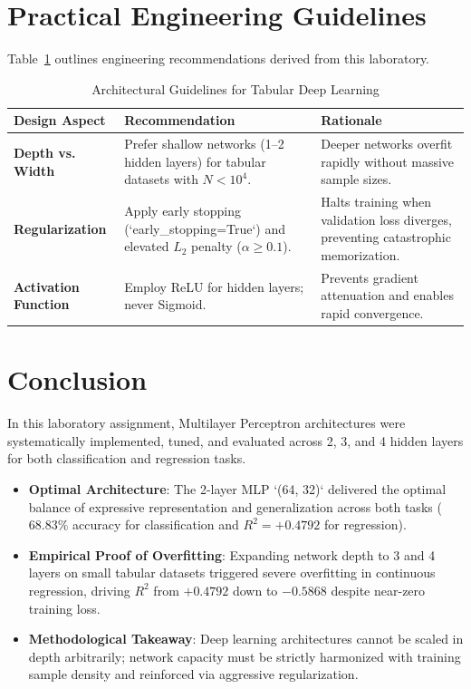 \documentclass[12pt]{article}
\begin{document}
\section{Practical Engineering Guidelines}
Table~\ref{tab:guidelines} outlines engineering recommendations derived from this laboratory.

\begin{table}[H]
\centering
\caption{Architectural Guidelines for Tabular Deep Learning}
\label{tab:guidelines}
\vspace{0.2cm}
\begin{tabular}{p{3.8cm}p{5.5cm}p{5.5cm}}
\toprule
\textbf{Design Aspect} & \textbf{Recommendation} & \textbf{Rationale} \\
\midrule
\textbf{Depth vs. Width} & Prefer shallow networks (1--2 hidden layers) for tabular datasets with $N < 10^4$. & Deeper networks overfit rapidly without massive sample sizes. \\
\addlinespace
\textbf{Regularization} & Apply early stopping (`early\_stopping=True`) and elevated $L_2$ penalty ($\alpha \ge 0.1$). & Halts training when validation loss diverges, preventing catastrophic memorization. \\
\addlinespace
\textbf{Activation Function} & Employ ReLU for hidden layers; never Sigmoid. & Prevents gradient attenuation and enables rapid convergence. \\
\bottomrule
\end{tabular}
\end{table}

\section{Conclusion}
In this laboratory assignment, Multilayer Perceptron architectures were systematically implemented, tuned, and evaluated across 2, 3, and 4 hidden layers for both classification and regression tasks.
\begin{itemize}
    \item \textbf{Optimal Architecture}: The 2-layer MLP `(64, 32)` delivered the optimal balance of expressive representation and generalization across both tasks ($68.83\%$ accuracy for classification and $R^2 = +0.4792$ for regression).
    \item \textbf{Empirical Proof of Overfitting}: Expanding network depth to 3 and 4 layers on small tabular datasets triggered severe overfitting in continuous regression, driving $R^2$ from $+0.4792$ down to $-0.5868$ despite near-zero training loss.
    \item \textbf{Methodological Takeaway}: Deep learning architectures cannot be scaled in depth arbitrarily; network capacity must be strictly harmonized with training sample density and reinforced via aggressive regularization.
\end{itemize}
\end{document}
